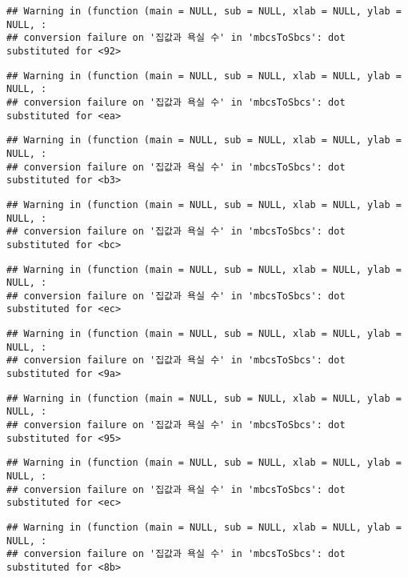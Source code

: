 \documentclass[
]{article}
\begin{document}
\begin{verbatim}
## Warning in (function (main = NULL, sub = NULL, xlab = NULL, ylab = NULL, :
## conversion failure on '집값과 욕실 수' in 'mbcsToSbcs': dot substituted for <92>
\end{verbatim}

\begin{verbatim}
## Warning in (function (main = NULL, sub = NULL, xlab = NULL, ylab = NULL, :
## conversion failure on '집값과 욕실 수' in 'mbcsToSbcs': dot substituted for <ea>
\end{verbatim}

\begin{verbatim}
## Warning in (function (main = NULL, sub = NULL, xlab = NULL, ylab = NULL, :
## conversion failure on '집값과 욕실 수' in 'mbcsToSbcs': dot substituted for <b3>
\end{verbatim}

\begin{verbatim}
## Warning in (function (main = NULL, sub = NULL, xlab = NULL, ylab = NULL, :
## conversion failure on '집값과 욕실 수' in 'mbcsToSbcs': dot substituted for <bc>
\end{verbatim}

\begin{verbatim}
## Warning in (function (main = NULL, sub = NULL, xlab = NULL, ylab = NULL, :
## conversion failure on '집값과 욕실 수' in 'mbcsToSbcs': dot substituted for <ec>
\end{verbatim}

\begin{verbatim}
## Warning in (function (main = NULL, sub = NULL, xlab = NULL, ylab = NULL, :
## conversion failure on '집값과 욕실 수' in 'mbcsToSbcs': dot substituted for <9a>
\end{verbatim}

\begin{verbatim}
## Warning in (function (main = NULL, sub = NULL, xlab = NULL, ylab = NULL, :
## conversion failure on '집값과 욕실 수' in 'mbcsToSbcs': dot substituted for <95>
\end{verbatim}

\begin{verbatim}
## Warning in (function (main = NULL, sub = NULL, xlab = NULL, ylab = NULL, :
## conversion failure on '집값과 욕실 수' in 'mbcsToSbcs': dot substituted for <ec>
\end{verbatim}

\begin{verbatim}
## Warning in (function (main = NULL, sub = NULL, xlab = NULL, ylab = NULL, :
## conversion failure on '집값과 욕실 수' in 'mbcsToSbcs': dot substituted for <8b>
\end{verbatim}
\end{document}

